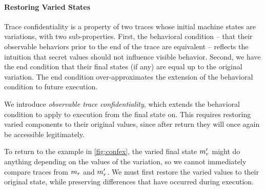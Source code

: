 \documentclass[acmsmall,review,anonymous]{acmart}\settopmatter{printfolios=true,printccs=false,printacmref=false}
\begin{document}
    \paragraph{Restoring Varied States}

      Trace confidentiality is a property of two traces whose initial machine
      states are variations, with two sub-properties. First, the behavioral
      condition -- that their observable behaviors prior to the end of the
      trace are equivalent -- reflects the intuition that secret values should
      not influence visible behavior. Second, we have the end condition that
      their final states (if any) are equal up to the original variation. The
      end condition over-approximates the extension of the behavioral condition
      to future execution.

      We introduce {\em observable trace confidentiality}, which extends the
      behavioral condition to apply to execution from the final state on.
      This requires restoring varied components to their original values,
      since after return they will once again be accessible legitimately.

      To return to the example in \cref{fig:confex}, the varied final state
      \(m_r'\) might do anything depending on the values of the variation,
      so we cannot immediately compare traces from \(m_r\) and
      \(m_r'\). We must first restore the varied values to their original
      state, while preserving differences that have occurred during
      execution.

\end{document}
